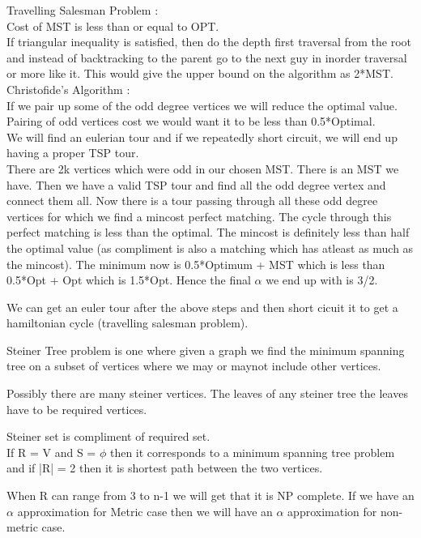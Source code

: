 \documentclass[solution,addpoints,12pt]{exam}
\begin{document}
Travelling Salesman Problem :\\
Cost of MST is less than or equal to OPT.\\
If triangular inequality is satisfied, then do the depth first
traversal from the root and instead of backtracking to the parent
go to the next guy in inorder traversal or more like it. This would
give the upper bound on the algorithm as 2*MST.\\

Christofide's Algorithm :\\
If we pair up some of the odd degree vertices we will reduce the
optimal value.
Pairing of odd vertices cost we would want it to be less than 0.5*Optimal.\\
We will find an eulerian tour and if we repeatedly short circuit, we will
end up having a proper TSP tour.\\
There are 2k vertices which were odd in our chosen MST.
There is an MST we have. Then we have a valid TSP tour and find all the odd
degree vertex and connect them all. Now there is a tour passing through
all these odd degree vertices for which we find a mincost perfect matching.
The cycle through this perfect matching is less than the optimal.
The mincost is definitely less than half the optimal value (as
compliment is also a matching which has atleast as much as the mincost).
The minimum now is 0.5*Optimum + MST which is less than 0.5*Opt + Opt
which is 1.5*Opt. Hence the final $\alpha$ we end up with is 3/2.

We can get an euler tour after the above steps and then short cicuit it
to get a hamiltonian cycle (travelling salesman problem).

Steiner Tree problem is one where given a graph we find the minimum
spanning tree on a subset of vertices where we may or maynot include
other vertices.

Possibly there are many steiner vertices. The leaves of any steiner tree
the leaves have to be required vertices.

Steiner set is compliment of required set.\\
If R = V and S = $\phi$ then it corresponds to a minimum spanning
tree problem and if |R| = 2 then it is shortest path between the two vertices.

When R can range from 3 to n-1 we will get that it is NP complete.
If we have an $\alpha$ approximation for Metric case then we will
have an $\alpha$ approximation for non-metric case.\\
\end{document}

